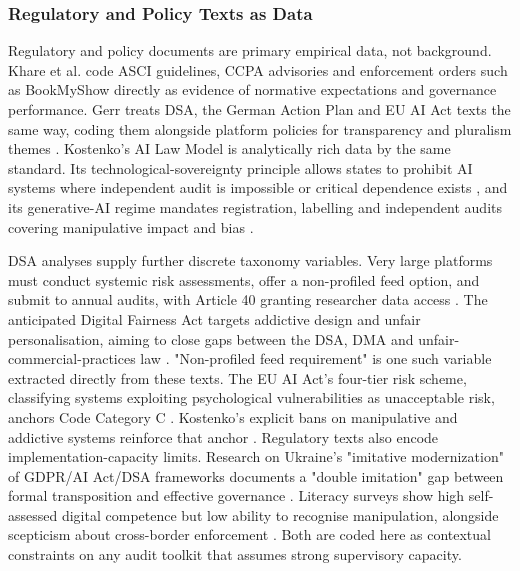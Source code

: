 \documentclass[11pt]{article}
\begin{document}
\subsubsection{Regulatory and Policy Texts as Data}
\label{sec:reg_policy_texts_data} Regulatory and policy documents are primary empirical data, not background. Khare et al. code ASCI guidelines, CCPA advisories and enforcement orders such as BookMyShow \parencites[6]{6295677} directly as evidence of normative expectations and governance performance. Gerr treats DSA, the German Action Plan and EU AI Act texts the same way, coding them alongside platform policies for transparency and pluralism themes \parencites[3]{5142478}. Kostenko's AI Law Model is analytically rich data by the same standard. Its technological-sovereignty principle allows states to prohibit AI systems where independent audit is impossible or critical dependence exists \parencites[107]{2977039}, and its generative-AI regime mandates registration, labelling and independent audits covering manipulative impact and bias \parencites[31]{2977039}.

DSA analyses supply further discrete taxonomy variables. Very large platforms must conduct systemic risk assessments, offer a non-profiled feed option, and submit to annual audits, with Article 40 granting researcher data access \parencites[7]{1456534}[19]{3195574}. The anticipated Digital Fairness Act targets addictive design and unfair personalisation, aiming to close gaps between the DSA, DMA and unfair-commercial-practices law \parencites[390]{7896734}. "Non-profiled feed requirement" is one such variable extracted directly from these texts. The EU AI Act's four-tier risk scheme, classifying systems exploiting psychological vulnerabilities as unacceptable risk, anchors Code Category C \parencites[12]{6502223}. Kostenko's explicit bans on manipulative and addictive systems reinforce that anchor \parencites[61--62]{2977039}[107]{2977039}. Regulatory texts also encode implementation-capacity limits. Research on Ukraine's "imitative modernization" of GDPR/AI Act/DSA frameworks documents a "double imitation" gap between formal transposition and effective governance \parencites[19]{5162643}. Literacy surveys show high self-assessed digital competence but low ability to recognise manipulation, alongside scepticism about cross-border enforcement \parencites[10]{9360054}. Both are coded here as contextual constraints on any audit toolkit that assumes strong supervisory capacity.
\end{document}
